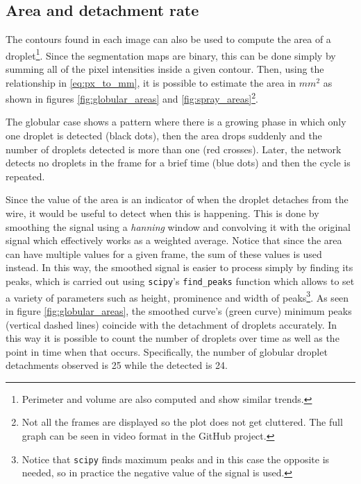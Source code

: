 \subsection{Area and detachment rate}

The contours found in each image can also be used to compute the area of a droplet\footnote{Perimeter and volume are also computed and show similar trends.}. Since the segmentation maps are binary, this can be done simply by summing all of the pixel intensities inside a given contour. Then, using the relationship in \eqref{eq:px_to_mm}, it is possible to estimate the area in $mm^2$ as shown in figures \ref{fig:globular_areas} and \ref{fig:spray_areas}\footnote{Not all the frames are displayed so the plot does not get cluttered. The full graph can be seen in video format in the GitHub project.}.

The globular case shows a pattern where there is a growing phase in which only one droplet is detected (black dots), then the area drops suddenly and the number of droplets detected is more than one (red crosses). Later, the network detects no droplets in the frame for a brief time (blue dots) and then the cycle is repeated.

Since the value of the area is an indicator of when the droplet detaches from the wire, it would be useful to detect when this is happening. This is done by smoothing the signal using a \textit{hanning} window and convolving it with the original signal which effectively works as a weighted average. Notice that since the area can have multiple values for a given frame, the sum of these values is used instead. In this way, the smoothed signal is easier to process simply by finding its peaks, which is carried out using \texttt{scipy}'s \texttt{find\_peaks} function which allows to set a variety of parameters such as height, prominence and width of peaks\footnote{Notice that \texttt{scipy} finds maximum peaks and in this case the opposite is needed, so in practice the negative value of the signal is used.}. As seen in figure \ref{fig:globular_areas}, the smoothed curve's (green curve) minimum peaks (vertical dashed lines) coincide with the detachment of droplets accurately. In this way it is possible to count the number of droplets over time as well as the point in time when that occurs. Specifically, the number of globular droplet detachments observed is 25 while the detected is 24.

